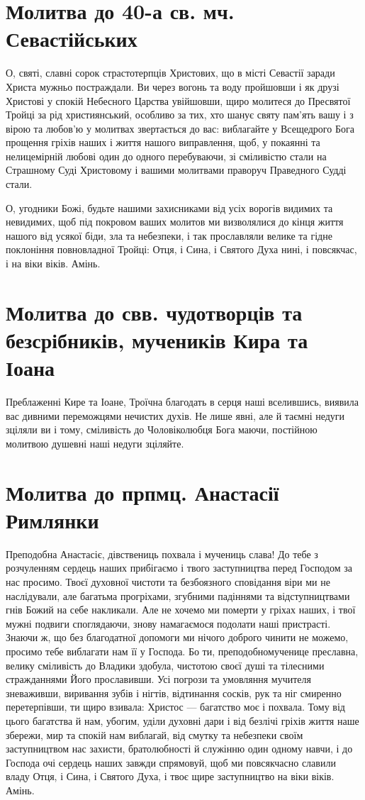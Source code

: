 \documentclass[chapters.tex]{subfiles}
\begin{document}
\section{Молитва до 40-а св. мч. Севастійських}
О, святі, славні сорок страстотерпців Христових, що в місті Севастії заради Христа мужньо постраждали. Ви через вогонь та воду пройшовши і як друзі Христові у спокій Небесного Царства увійшовши, щиро молитеся до Пресвятої Тройці за рід християнський, особливо за тих, хто шанує святу пам’ять вашу і з вірою та любов’ю у молитвах звертається до вас: виблагайте у Всещедрого Бога прощення гріхів наших і життя нашого виправлення, щоб, у покаянні та нелицемірній любові один до одного перебуваючи, зі сміливістю стали на Страшному Суді Христовому і вашими молитвами праворуч Праведного Судді стали.

О, угодники Божі, будьте нашими захисниками від усіх ворогів видимих та невидимих, щоб під покровом ваших молитов ми визволялися до кінця життя нашого від усякої біди, зла та небезпеки, і так прославляли велике та гідне поклоніння повновладної Тройці: Отця, і Сина, і Святого Духа нині, і повсякчас, і на віки віків. Амінь.

\section{Молитва до свв. чудотворців та безсрібників, мучеників Кира та Іоана}
Преблаженні Кире та Іоане, Троїчна благодать в серця наші вселившись, виявила вас дивними переможцями нечистих духів. Не лише явні, але й таємні недуги зціляли ви і тому, сміливість до Чоловіколюбця Бога маючи, постійною молитвою душевні наші недуги зціляйте.

\section{Молитва до прпмц. Анастасії Римлянки}
Преподобна Анастасіє, дівствениць похвала і мучениць слава! До тебе з розчуленням сердець наших прибігаємо і твого заступництва перед Господом за нас просимо. Твоєї духовної чистоти та безбоязного сповідання віри ми не наслідували, але багатьма прогріхами, згубними падіннями та відступництвами гнів Божий на себе накликали. Але не хочемо ми померти у гріхах наших, і твої мужні подвиги споглядаючи, знову намагаємося подолати наші пристрасті. Знаючи ж, що без благодатної допомоги ми нічого доброго чинити не можемо, просимо тебе виблагати нам її у Господа. Бо ти, преподобномученице преславна, велику сміливість до Владики здобула, чистотою своєї душі та тілесними стражданнями Його прославивши. Усі погрози та умовляння мучителя зневаживши, виривання зубів і нігтів, відтинання сосків, рук та ніг смиренно перетерпівши, ти щиро взивала: Христос — багатство моє і похвала. Тому від цього багатства й нам, убогим, уділи духовні дари і від безлічі гріхів життя наше збережи, мир та спокій нам виблагай, від смутку та небезпеки своїм заступництвом нас захисти, братолюбності й служінню один одному навчи, і до Господа очі сердець наших завжди спрямовуй, щоб ми повсякчасно славили владу Отця, і Сина, і Святого Духа, і твоє щире заступництво на віки віків. Амінь.
\end{document}
